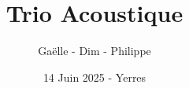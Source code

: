 \usepackage{array}
\usepackage[table]{xcolor}

\usepackage[chorded,noscripture]{songs}
\usepackage{lyluatex}

\usepackage{fontspec}
\usepackage{lilyglyphs}

\indexesoff

\renewcommand{\everychorus}{\textnote{Chorus:}}

\renewcommand{\lyricfont}{\sffamily\small}
\renewcommand{\printchord}[1]{\rmfamily\bf#1}


\title{Trio Acoustique}
\author{Gaëlle - Dim - Philippe }
\date{14 Juin 2025 - Yerres}
